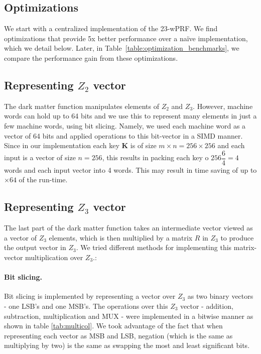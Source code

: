 \subsection{Optimizations}
\label{subsec:implementation_opt}
We start with a centralized implementation of the 23-wPRF. We find optimizations that provide 5x better performance over a na\"ive implementation, which we detail below. Later, in Table~\ref{table:optimization_benchmarks}, we compare the performance gain from these optimizations.


\subsection{Representing $Z_2$ vector}

The dark matter function manipulates elements of $Z_2$ and $Z_3$. However, machine words can hold up to 64 bits and we use this to represent many elements in just a few machine words, using bit slicing. Namely, we used each machine word as a vector of 64 bits and applied operations to this bit-vector in a SIMD manner.
Since in our implementation each key $\textbf{K}$  is of size $m \times n = 256 \times 256$ and each input is a vector of size $n = 256$, this results in packing each key o $256 \dfrac 64 = 4$ words and each input vector into 4 words. This may result in time saving of up to $\times 64$ of the run-time.

\subsection{Representing $Z_3$ vector}

The last part of the dark matter function takes an intermediate vector viewed as a vector of $Z_3$ elements, which is then multiplied 
by a matrix $R$ in $Z_3$ to produce the output vector in $Z_3$. We tried different methods for implementing this matrix-vector multiplication over $Z_3$.:	



\paragraph{Bit slicing.}

Bit slicing is implemented  by representing a vector over $Z_3$  as two binary vectors - one LSB's and one MSB's. The operations over this $Z_3$ vector - addition, subtraction, multiplication and MUX  - were implemented in a bitwise manner as shown in table \ref{tab:multicol}. We took advantage of the fact that when representing each vector as MSB and LSB, negation (which is the same as multiplying by two) is the same as swapping the most and least significant bits. 

